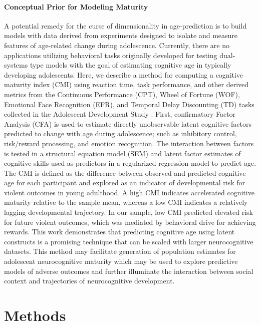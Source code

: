 \documentclass[utf8]{stylesheet}
\begin{document}
\paragraph{Conceptual Prior for Modeling Maturity} A potential remedy for the curse of dimensionality in age-prediction is to build models with data derived from experiments designed to isolate and measure features of age-related change during adolescence. Currently, there are no applications utilizing behavioral tasks originally developed for testing dual-systems type models with the goal of estimating cognitive age in typically developing adolescents. Here, we describe a method for computing a cognitive maturity index (CMI) using reaction time, task performance, and other derived metrics from the Continuous Performance (CPT), Wheel of Fortune (WOF), Emotional Face Recognition (EFR), and Temporal Delay Discounting (TD) tasks collected in the Adolescent Development Study \citep{Fishbein2016}. First, confirmatory Factor Analysis (CFA) is used to estimate directly unobservable latent cognitive factors predicted to change with age during adolescence; such as inhibitory control, risk/reward processing, and emotion recognition. The interaction between factors is tested in a structural equation model (SEM) and latent factor estimates of cognitive skills used as predictors in a regularized regression model to predict age. The CMI is defined as the difference between observed and predicted cognitive age for each participant and explored as an indicator of developmental risk for violent outcomes in young adulthood. A high CMI indicates accelerated cognitive maturity relative to the sample mean, whereas a low CMI indicates a relatively lagging developmental trajectory. In our sample, low CMI predicted elevated risk for future violent outcomes, which was mediated by behavioral drive for achieving rewards. This work demonstrates that predicting cognitive age using latent constructs is a promising technique that can be scaled with larger neurocognitive datasets. This method may facilitate generation of population estimates for adolescent neurocognitive maturity which may be used to explore predictive models of adverse outcomes and further illuminate the interaction between social context and trajectories of neurocognitive development. 
\section{Methods}
\end{document}
